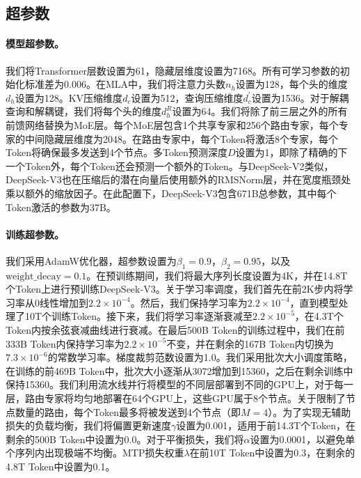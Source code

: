 \documentclass[lang=cn,a4paper,newtx]{elegantpaper}
\newcommand{\dsvii}{DeepSeek-V2}
\newcommand{\dsattn}{MLA}
\newcommand{\dsviii}{DeepSeek-V3}
\begin{document}
\subsection{超参数}

\paragraph{模型超参数。}
我们将Transformer层数设置为61，隐藏层维度设置为7168。所有可学习参数的初始化标准差为0.006。在\dsattn{}中，我们将注意力头数$n_h$设置为128，每个头的维度$d_h$设置为128。KV压缩维度$d_c$设置为512，查询压缩维度$d_c^{\prime}$设置为1536。对于解耦查询和解耦键，我们将每个头的维度$d_h^R$设置为64。我们将除了前三层之外的所有前馈网络替换为MoE层。每个MoE层包含1个共享专家和256个路由专家，每个专家的中间隐藏层维度为2048。在路由专家中，每个Token将激活8个专家，每个Token将确保最多发送到4个节点。多Token预测深度$D$设置为1，即除了精确的下一个Token外，每个Token还会预测一个额外的Token。与\dsvii{}类似，\dsviii{}也在压缩后的潜在向量后使用额外的RMSNorm层，并在宽度瓶颈处乘以额外的缩放因子。在此配置下，\dsviii{}包含671B总参数，其中每个Token激活的参数为37B。

\paragraph{训练超参数。}
我们采用AdamW优化器，超参数设置为$\beta_1=0.9$，$\beta_2=0.95$，以及$\mathrm{weight\_decay}=0.1$。在预训练期间，我们将最大序列长度设置为4K，并在14.8T个Token上进行预训练\dsviii{}。关于学习率调度，我们首先在前2K步内将学习率从0线性增加到$2.2 \times 10^{-4}$。然后，我们保持学习率为$2.2 \times 10^{-4}$，直到模型处理了10T个训练Token。接下来，我们将学习率逐渐衰减至$2.2 \times 10^{-5}$，在4.3T个Token内按余弦衰减曲线进行衰减。在最后500B Token的训练过程中，我们在前333B Token内保持学习率为$2.2 \times 10^{-5}$不变，并在剩余的167B Token内切换为$7.3 \times 10^{-6}$的常数学习率。梯度裁剪范数设置为1.0。我们采用批次大小调度策略，在训练的前469B Token中，批次大小逐渐从3072增加到15360，之后在剩余训练中保持15360。我们利用流水线并行将模型的不同层部署到不同的GPU上，对于每一层，路由专家将均匀地部署在64个GPU上，这些GPU属于8个节点。关于限制了节点数量的路由，每个Token最多将被发送到4个节点（即$M=4$）。为了实现无辅助损失的负载均衡，我们将偏置更新速度$\gamma$设置为0.001，适用于前14.3T个Token，在剩余的500B Token中设置为0.0。对于平衡损失，我们将$\alpha$设置为0.0001，以避免单个序列内出现极端不均衡。MTP损失权重$\lambda$在前10T Token中设置为0.3，在剩余的4.8T Token中设置为0.1。
\end{document}
